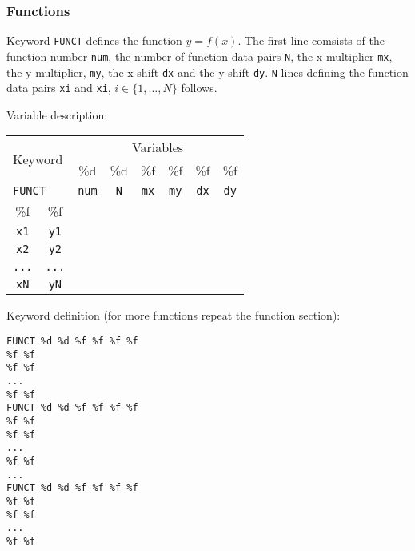 \newpage


\subsubsection{Functions}

Keyword \texttt{FUNCT} defines the function $y=f(x)$. The first line comsists of the function number \texttt{num}, the number of function data pairs \texttt{N}, the x-multiplier \texttt{mx}, the y-multiplier, \texttt{my}, the x-shift \texttt{dx} and the y-shift \texttt{dy}. \texttt{N} lines defining the function data pairs \texttt{xi} and \texttt{xi}, $i\in\{1,\dots,N\}$ follows.

Variable description:

\begin{tabular}{|c|c|c|c|c|c|c|c|}
\hline
\multicolumn{2}{|l|}{\multirow{2}{*}{Keyword}} & \multicolumn{6}{c|}{Variables} \\ \cline{3-8}
\multicolumn{2}{|l|}{} & \%d & \%d & \%f & \%f & \%f & \%f \\ \hline
\multicolumn{2}{|l|}{\texttt{FUNCT}} & \texttt{num} & \texttt{N} & \texttt{mx} & \texttt{my} & \texttt{dx} & \texttt{dy} \\ \hline
\%f & \%f \\ \cline{1-2}
\texttt{x1} & \texttt{y1} \\ \cline{1-2}
\texttt{x2} & \texttt{y2} \\ \cline{1-2}
\texttt{...} & \texttt{...} \\ \cline{1-2}
\texttt{xN} & \texttt{yN} \\ \cline{1-2}
\end{tabular}

Keyword definition (for more functions repeat the function section):

\begin{tcolorbox}
\texttt{FUNCT \%d \%d \%f \%f \%f \%f \\
 \%f \%f \\
 \%f \%f \\
... \\
 \%f \%f \\
FUNCT \%d \%d \%f \%f \%f \%f \\
 \%f \%f \\
 \%f \%f \\
... \\
 \%f \%f \\
... \\
FUNCT \%d \%d \%f \%f \%f \%f \\
 \%f \%f \\
 \%f \%f \\
... \\
 \%f \%f}
\end{tcolorbox}

